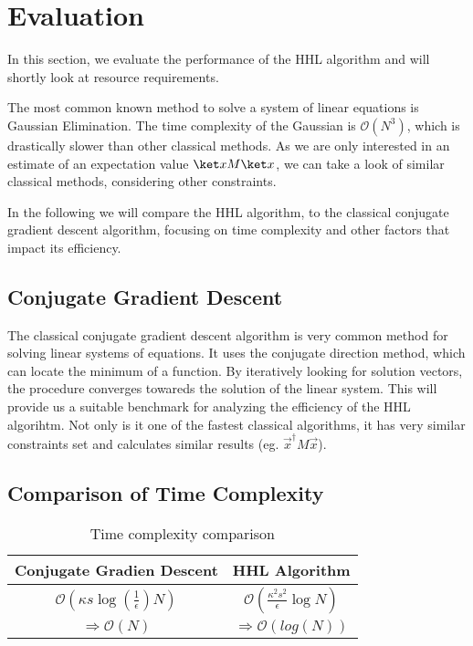 \section{Evaluation}

\begin{comment}
look at gauß verfahren 
not fastest
look at same constraints 
conjugate gradient descent much faster with similiar requirements
only interested in estimate of $\vec{x}^\dagger M \vec x$
this runs in $ \mathcal{O}(\kappa s log{\left(\frac 1 \epsilon\right)} N ) $
where 
\end{comment}

In this section, we evaluate the performance of the HHL algorithm and will shortly look at resource requirements.

The most common known method to solve a system of linear equations is Gaussian Elimination. 
The time complexity of the Gaussian is $\mathcal{O} (N^3)$, which is drastically slower than other classical methods.
As we are only interested in an estimate of an expectation value $\ket x M \ket x$, we can take a look of similar classical methods, considering other constraints.

In the following we will compare the HHL algorithm, to the classical conjugate gradient descent algorithm, focusing on time complexity and other factors that impact its efficiency.

\subsection{Conjugate Gradient Descent}
The classical conjugate gradient descent algorithm is very common method for solving linear systems of equations. 
It uses the conjugate direction method, which can locate the minimum of a function. 
By iteratively looking for solution vectors, the procedure converges towareds the solution of the linear system.
This will provide us a suitable benchmark for analyzing the efficiency of the HHL algorihtm.
Not only is it one of the fastest classical algorithms, it has very similar constraints set and calculates similar results (eg. $\vec{x}^\dagger M \vec x$).

\subsection{Comparison of Time Complexity }
\begin{table}[htbp]
    \caption{Time complexity comparison}
    \begin{center}
    \begin{tabular}{|c|c|}
    \hline
    \textbf{Conjugate Gradien Descent} & \textbf{HHL Algorithm} \\
    \hline
    $\mathcal{O}(\kappa s \log\left(\frac{1}{\epsilon}\right) N)$  &  $\mathcal{O}\left(\frac{\kappa^2s^2}{\epsilon}\log N\right)$\\
    \hline
    $\Rightarrow \mathcal{O} (N)$ & $\Rightarrow \mathcal{O} (log(N))$\\ 
    \hline
    \end{tabular}
    \end{center}
\end{table}

